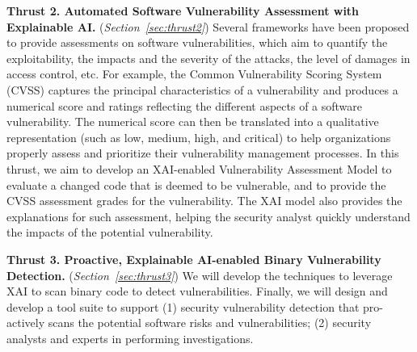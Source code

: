 \vspace{3pt}
\noindent \textbf{Thrust 2. Automated Software Vulnerability
  Assessment with Explainable AI.} ({\em Section~\ref{sec:thrust2}})
Several frameworks have been proposed to provide assessments on
software vulnerabilities, which aim to quantify the exploitability,
the impacts and the severity of the attacks, the level of damages in
access control, etc. For example, the Common Vulnerability Scoring
System (CVSS) captures the principal characteristics of a
vulnerability and produces a numerical score and ratings reflecting
the different aspects of a software vulnerability. The numerical score
can then be translated into a qualitative representation (such as low,
medium, high, and critical) to help organizations properly assess and
prioritize their vulnerability management processes. In this thrust,
we aim to develop an XAI-enabled Vulnerability Assessment Model to
evaluate a changed code that is deemed to be vulnerable, and to
provide the CVSS assessment grades for the vulnerability. The XAI
model also provides the explanations for such assessment, helping the
security analyst quickly understand the impacts of the potential
vulnerability.

\vspace{3pt}
\noindent \textbf{Thrust 3. Proactive, Explainable AI-enabled Binary
  Vulnerability Detection.} ({\em Section~\ref{sec:thrust3}}) We will
develop the techniques to leverage XAI to scan binary code to detect
vulnerabilities. Finally, we will design and develop a tool suite to
support (1)
security vulnerability detection that pro-actively scans the
potential software risks and vulnerabilities; (2) security analysts and
experts in performing investigations.






